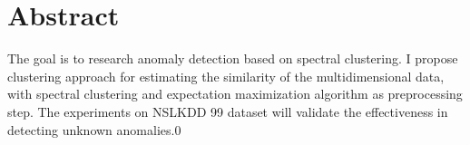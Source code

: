\chapter{Abstract}

The goal is to research anomaly detection based on spectral clustering. I propose clustering approach for estimating the similarity of the multi­dimensional data, with spectral clustering and expectation maximization algorithm as pre­processing step. The experiments on NSL­KDD 99 dataset will validate the effectiveness in detecting unknown anomalies.0
